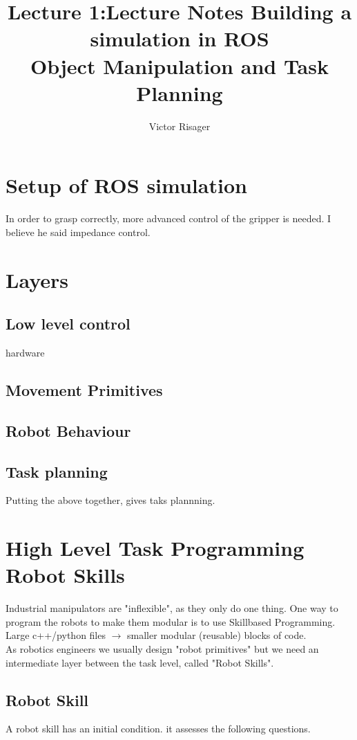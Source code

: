 \documentclass[a4paper]{article}
\title{Lecture 1:Lecture Notes Building a simulation in ROS \\
	\large Object Manipulation and Task Planning}
\author{Victor Risager}
\begin{document}
\maketitle

\section{Setup of ROS simulation}
In order to grasp correctly, more advanced control of the gripper is needed. I believe he said impedance control.


\section{Layers}
\subsection{Low level control}
hardware
\subsection{Movement Primitives}

\subsection{Robot Behaviour}

\subsection{Task planning}
Putting the above together, gives taks plannning.

\section{High Level Task Programming Robot Skills}
Industrial manipulators are "inflexible", as they only do one thing. One way to program the robots to make them modular is to use Skillbased Programming. Large c++/python files $ \rightarrow $ smaller modular (reusable) blocks of code.\\
As robotics engineers we usually design "robot primitives" but we need an intermediate layer between the task level, called "Robot Skills".


\subsection{Robot Skill}
A robot skill has an initial condition. it assesses the following questions.
\end{document}
